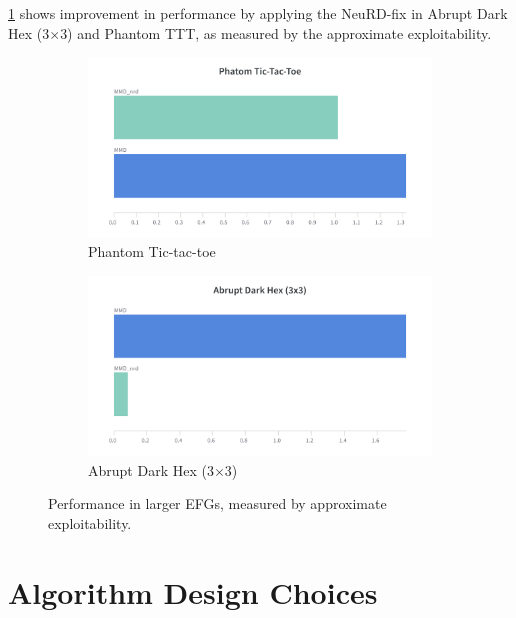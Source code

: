 
\ref{fig:neural2} shows improvement in performance by applying the NeuRD-fix in Abrupt Dark Hex
(3$\times$3) and Phantom TTT, as measured by the approximate exploitability.
\begin{figure}[H]
	\centering
	\begin{subfigure}[b]{0.4\textwidth}
		\includegraphics[width=\textwidth]{figs/pttt.png}
		\caption{Phantom Tic-tac-toe}
	\end{subfigure}
	\begin{subfigure}[b]{0.4\textwidth}
		\includegraphics[width=\textwidth]{figs/ahex33.png}
		\caption{Abrupt Dark Hex (3$\times$3)}
	\end{subfigure}
	\caption{Performance in larger EFGs, measured by approximate exploitability.}
	\label{fig:neural2}
\end{figure}

\section{Algorithm Design Choices}

